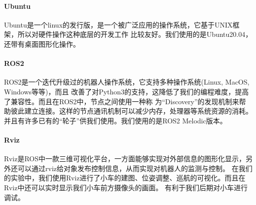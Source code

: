\documentclass[a4paper,twoside]{article}
\begin{document}
\paragraph*{Ubuntu}
Ubuntu是一个linux的发行版，是一个被广泛应用的操作系统，它基于UNIX框架，所以对硬件操作这种底层的开发工作
比较友好。我们使用的是Ubuntu20.04，还带有桌面图形化操作。

\paragraph*{ROS2}
ROS2是一个迭代升级过的机器人操作系统，它支持多种操作系统(Linux, MacOS, Windows等等)，而且
改善了对Python3的支持，这降低了我们的编程难度，提高了兼容性。而且在ROS2中，节点之间使用一种称
为“Discovery”的发现机制来帮助彼此建立连接。这样的节点通讯机制可以减少内存，处理器等系统资源的消耗。
并且有许多已有的“轮子”供我们使用。我们使用的是ROS2 Melodic版本。

\paragraph*{Rviz}
Rviz是ROS中一款三维可视化平台，一方面能够实现对外部信息的图形化显示，另外还可以通过rviz给对象发布控制信息，从而实现对机器人的监测与控制。
在我们的实验中，我们使用Rviz进行了小车的建图、位姿调整、巡航的可视化。而且在Rviz中还可以实时显示我们小车前方摄像头的画面。
有利于我们后期对小车进行调试。
\end{document}

